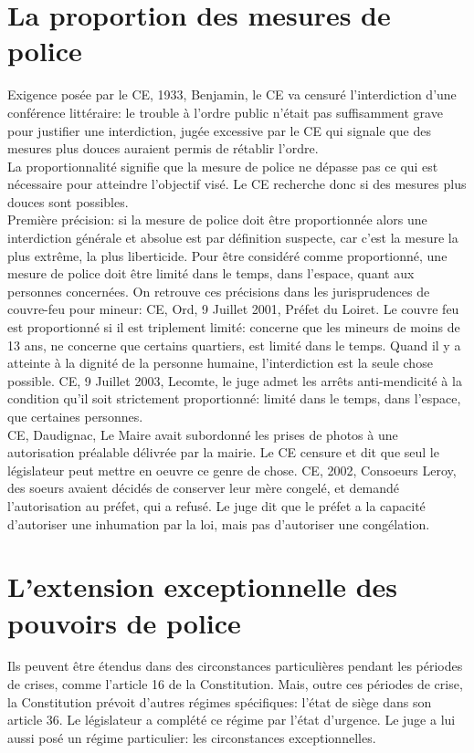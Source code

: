 \documentclass[10pt, a4paper, openany]{book}
\begin{document}
\section{La proportion des mesures de police}

Exigence posée par le CE, 1933, Benjamin, le CE va censuré l'interdiction d'une conférence littéraire: le trouble à l'ordre public n'était pas suffisamment grave pour justifier une interdiction, jugée excessive par le CE qui signale que des mesures plus douces auraient permis de rétablir l'ordre. \\
La proportionnalité signifie que la mesure de police ne dépasse pas ce qui est nécessaire pour atteindre l'objectif visé. Le CE recherche donc si des mesures plus douces sont possibles. \\
Première précision: si la mesure de police doit être proportionnée alors une interdiction générale et absolue est par définition suspecte, car c'est la mesure la plus extrême, la plus liberticide. Pour être considéré comme proportionné, une mesure de police doit être limité dans le temps, dans l'espace, quant aux personnes concernées. On retrouve ces précisions dans les jurisprudences de couvre-feu pour mineur: CE, Ord, 9 Juillet 2001, Préfet du Loiret. Le couvre feu est proportionné si il est triplement limité: concerne que les mineurs de moins de 13 ans, ne concerne que certains quartiers, est limité dans le temps. Quand il y a atteinte à la dignité de la personne humaine, l'interdiction est la seule chose possible. CE, 9 Juillet 2003, Lecomte, le juge admet les arrêts anti-mendicité à la condition qu'il soit strictement proportionné: limité dans le temps, dans l'espace, que certaines personnes. \\
CE, Daudignac, Le Maire avait subordonné les prises de photos à une autorisation préalable délivrée par la mairie. Le CE censure et dit que seul le législateur peut mettre en oeuvre ce genre de chose. CE, 2002, Consoeurs Leroy, des soeurs avaient décidés de conserver leur mère congelé, et demandé l'autorisation au préfet, qui a refusé. Le juge dit que le préfet a la capacité d'autoriser une inhumation par la loi, mais pas d'autoriser une congélation.

\section{L'extension exceptionnelle des pouvoirs de police}

Ils peuvent être étendus dans des circonstances particulières pendant les périodes de crises, comme l'article 16 de la Constitution. Mais, outre ces périodes de crise, la Constitution prévoit d'autres régimes spécifiques: l'état de siège dans son article 36. Le législateur a complété ce régime par l'état d'urgence. Le juge a lui aussi posé un régime particulier: les circonstances exceptionnelles. 
\end{document}
